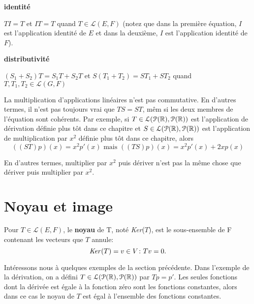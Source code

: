 \documentclass[12pt]{book}
\begin{document}
\noindent
\textbf{identité}
\begin{indpar}
$TI=T$ et $IT=T$ quand $T\in \mathcal{L}(E,F)$ (notez que dans la première équation, $I$ est l'application identité de $E$ et dans la deuxième, $I$ est l'application identité de $F$).
\end{indpar}

\noindent
\textbf{distributivité}
\begin{indpar}
$(S_1 + S_2)T=S_1T + S_2T$ et $S(T_1 + T_2)=ST_1 + ST_2$ quand $T,T_1,T_2\in \mathcal{L}(G,F)$ \\
\end{indpar}

La multiplication d'applications linéaires n'est pas commutative. En d'autres termes, il n'est pas toujours vrai que $TS=ST$, mêm si les deux membres de l'équation sont cohérents. Par exemple, si $T\in \mathcal{L}(\mathcal{P}(\mathbb{R}),\mathcal{P}(\mathbb{R}))$ est l'application de dérivation définie plus tôt dans ce chapitre et $S\in \mathcal{L}(\mathcal{P}(\mathbb{R}),\mathcal{P}(\mathbb{R}))$ est l'application de multiplication par $x^2$ définie plus tôt dans ce chapitre, alors 
\begin{equation*}
    ((ST)p)(x) = x^2p'(x) \textrm{ mais } ((TS)p)(x) = x^2p'(x) + 2xp(x)
\end{equation*}

\noindent
En d'autres termes, multiplier par $x^2$ puis dériver n'est pas la même chose que dériver puis multiplier par $x^2$. 

\section*{Noyau et image}

Pour $T \in \mathcal{L}(E,F)$, le \textbf{noyau} de T, noté \textit{Ker}($T$), est le sous-ensemble de F contenant les vecteurs que $T$ annule:
\begin{equation*}
    \textrm{\textit{Ker}($T$)}={v\in V \colon Tv=0}.
\end{equation*}


Intéressons nous à quelques exemples de la section précédente. Dans l'exemple de la dérivation, on a défini $T\in \mathcal{L}(\mathcal{P}(\mathbb{R}),\mathcal{P}(\mathbb{R}))$ par $Tp=p'$. Les seules fonctions dont la dérivée est égale à la fonction zéro sont les fonctions constantes, alors dans ce cas le noyau de $T$ est égal à l'ensemble des fonctions constantes.
\end{document}
